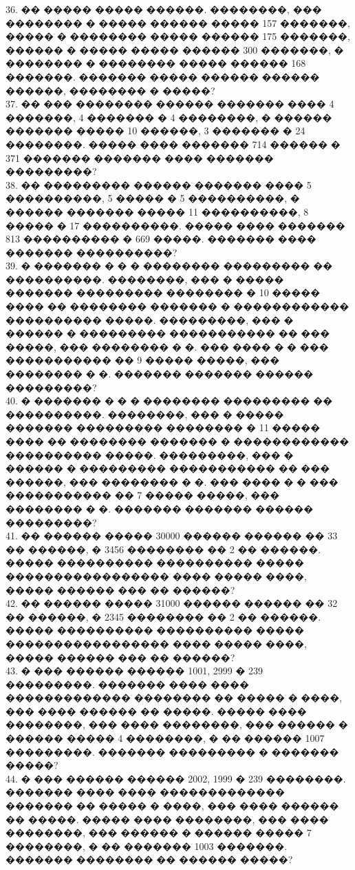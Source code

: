 \documentclass[12pt]{article}
\begin{document}
36. �� ����� ����� ������. ��������, ��� �������� � ����� ������ ����� 157 �������, ����� � �������� ����� ������ 175 �������, ������ � ����� ����� ������ 300 �������, � �������� � �������� ����� ������ 168 �������. ������� ����� ������ ������ ������, �������� � �����?\\
37. �� ��� �������� ������ ������� ���� 4 �������, 4 ������� � 4 ��������, � ������ ������� ����� 10 ������, 3 ������� � 24 ��������. ����� ���� ������� 714 ������ � 371 ������� ������� ���� ������� ���������?\\
38. �� ��������� ������ ������� ���� 5 ����������, 5 ����� � 5 ����������, � ������ ������� ����� 11 ����������, 8 ����� � 17 ����������. ����� ���� ������� 813 ���������� � 669 �����. ������� ���� ������� ����������?\\
39. � ������� � � � �������� ��������� �� ����������. ��������, ��� � ����� ������� ��������� �������� � 10 ����� ���� �� �������� ������� � ������������ ���������� �����. ���������, ��� � ������ � ��������� ����������� �� ��� �����, ��� �������� � �. ��� ���� � � ��� ����������� �� 9 ����� �����, ��� �������� � �. ������� ������� ������ ���������?\\
40. � ������� � � � �������� ��������� �� ����������. ��������, ��� � ����� ������� ��������� �������� � 11 ����� ���� �� �������� ������� � ������������ ���������� �����. ���������, ��� � ������ � ��������� ����������� �� ��� ������, ��� �������� � �. ��� ���� � � ��� ����������� �� 7 ����� �����, ��� �������� � �. ������� ������� ������ ���������?\\
41. �� ������ ����� 30000 ������ ������ �� 33 �� ������, � 3456 �������� �� 2 �� ������. ����� ���������� ���������� ����� ����������������� ���� ����� ����, ����� ������ ��� �� ������?\\
42. �� ������ ����� 31000 ������ ������ �� 32 �� ������, � 2345 �������� �� 2 �� ������. ����� ���������� ���������� ����� ����������������� ���� ����� ����, ����� ������ ��� �� ������?\\
43. � ��� ������ ������ 1001, 2999 � 239 ���������. ������� ���� ���� ������������� �������� �� ����� � ����, ��� ���� ������ �� �����. ����� ���� ��������, ��� ���� ��������, ��� ������ � ������ ����� 4 ��������, � �� ������ 1007 ���������. ������� ��������� � ������� �����?\\
44. � ��� ������ ������ 2002, 1999 � 239 ��������. ������� ���� ���� ������������� ������� �� ����� � ����, ��� ���� ������ �� �����. ����� ���� ��������, ��� ���� ��������, ��� ������ � ������ ����� 7 ��������, � �� ������� 1003 �������. ������� �������� �� ������ �����?\\
\end{document}
